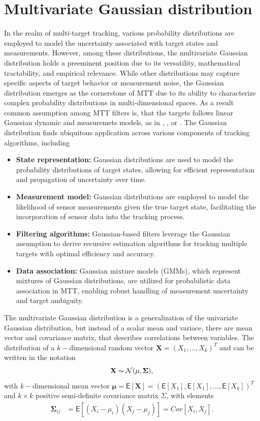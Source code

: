     \section{Multivariate Gaussian distribution}
In the realm of multi-target tracking, various probability distributions are employed to model the uncertainty
associated with target states and measurements. However, among these distributions, the multivariate Gaussian distribution holds a preeminent position due to its versatility, mathematical tractability, and empirical relevance. While other distributions may capture specific aspects of target behavior or measurement noise, the Gaussian distribution emerges as the cornerstone of MTT due to its ability to characterize complex probability distributions in multi-dimensional spaces. As a result common assumption among MTT filters is, that the targets follows linear Gaussian dynamic and measuremets models, as in \cite{bar1995}, \cite{GarciaPMBM2018}, or \cite{VoMaPHD2006}. The Gaussian distribution finds ubiquitous application across various components of tracking algorithms, including
\begin{itemize}
    \item \textbf{State representation:} Gaussian distributions are used to model the probability distributions of target states, allowing for efficient representation and propagation of uncertainty over time.
    \item \textbf{Measurement model:} Gaussian distributions are employed to model the likelihood of sensor measurements given the true target state, facilitating the incorporation of sensor data into the tracking process.
    \item \textbf{Filtering algorithms:} Gaussian-based filters leverage the Gaussian assumption to derive recursive estimation algorithms for tracking multiple targets with optimal efficiency and accuracy.
    \item \textbf{Data association:} Gaussian mixture models (GMMs), which represent mixtures of Gaussian distributions, are utilized for probabilistic data association in MTT, enabling robust handling of measurement uncertainty and target ambiguity.
\end{itemize}
\begin{note}
The multivariate Gaussian distribution is a generalization of the univariate Gaussian distribution, but instead of a scalar mean and variace, there are mean vector and covariance matrix, that describes correlations between variables. The distribution of a $k-$dimensional random vector $\mathbf{X} = (X_1,\dots,X_k)^T$ and can be written in the notation
\[\mathbf{X} \thicksim \mathcal{N}(\mathbf{\mu}, \mathbf{\Sigma}),\]
with
$k-$dimensional mean vector
$\mathbf{\mu} = \mathsf{E}[\mathbf{X}] = (\mathsf{E}[X_1], \mathsf{E}[X_1], \dots, \mathsf{E}[X_k])^T$
and
$k\times k$ positive semi-definite covariance matrix $\Sigma$, with elements
\begin{align}
    \mathbf{\Sigma}_{ij} &= \mathsf{E}[(X_i - \mu_i)(X_j - \mu_j)] = Cov[X_i, X_j].
\end{align}

\end{note}
